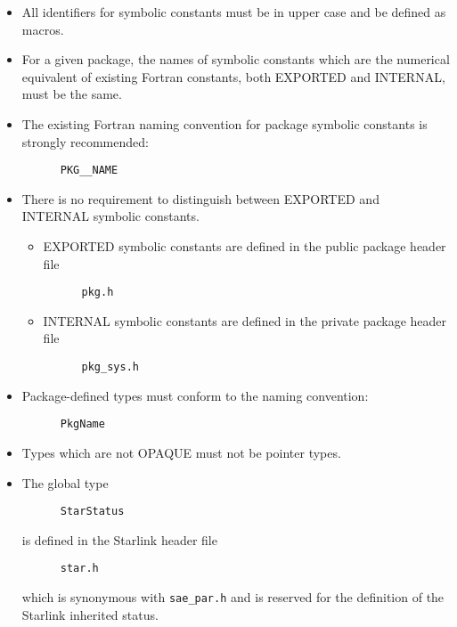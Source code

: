 \begin{itemize}
\item All identifiers for symbolic constants must be in upper case and be 
defined as macros.
\item For a given package, the names of symbolic constants which are the 
numerical equivalent of existing Fortran constants, both EXPORTED and 
INTERNAL, must be the same.
\item The existing Fortran naming convention for package symbolic constants 
is strongly recommended:
\begin{verbatim}
      PKG__NAME
\end{verbatim}
\item There is no requirement to distinguish between EXPORTED and INTERNAL 
symbolic constants.
\begin{itemize}
\item EXPORTED symbolic constants are defined in the public package header 
file
\begin{verbatim}
      pkg.h
\end{verbatim}
\item INTERNAL symbolic constants are defined in the private package header 
file
\begin{verbatim}
      pkg_sys.h
\end{verbatim}
\end{itemize}
\end{itemize}

\begin{itemize}
\item Package-defined types must conform to the naming convention:
\begin{verbatim}
      PkgName
\end{verbatim}
\item Types which are not OPAQUE must not be pointer types.
\item The global type
\begin{verbatim}
      StarStatus
\end{verbatim}
is defined in the Starlink header file
\begin{verbatim}
      star.h
\end{verbatim}
which is synonymous with {\tt sae\_par.h} and is reserved for the definition 
of the Starlink inherited status.
\end{itemize}

